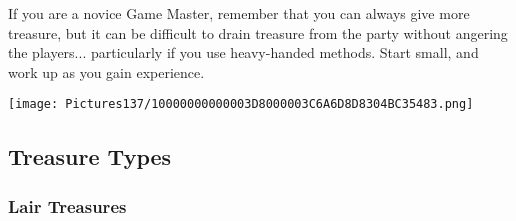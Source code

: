 \documentclass[a4paper,twoside,openany,10pt]{book}
\begin{document}
\begin{multicols}{2}
If you are a novice Game Master, remember that you can always give more treasure, but it can be difficult to drain treasure from the party without angering the players... particularly if you use heavy-handed methods. Start small, and work up as you gain experience. 

\begin{flushleft} \texttt{[image: Pictures137/10000000000003D8000003C6A6D8D8304BC35483.png]}  \end{flushleft}

\end{multicols}

\subsection{Treasure Types}\label{treasure-types}

\subsubsection{Lair Treasures}\label{lair-treasures}
\end{document}

